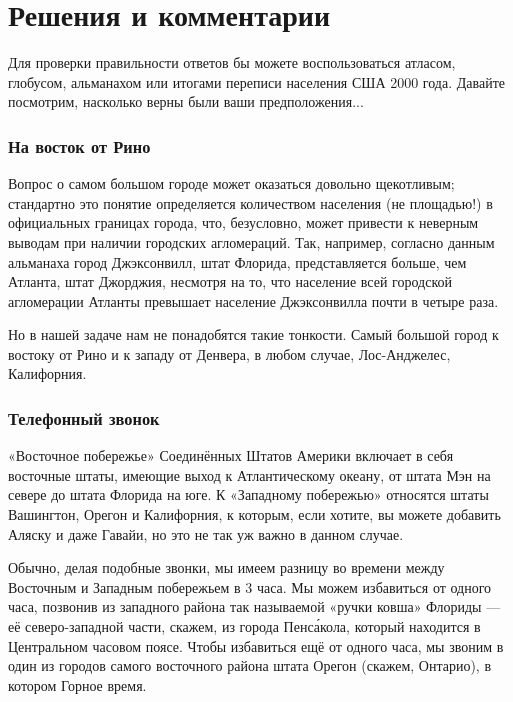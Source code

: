 \section*{Решения и комментарии}


Для проверки правильности ответов  бы можете воспользоваться атласом, глобусом, альманахом  или итогами переписи населения США 2000 года. 
Давайте посмотрим, насколько верны были ваши предположения...


\subsubsection*{На восток от Рино}%


Вопрос о самом большом городе может оказаться довольно щекотливым; 
стандартно  это понятие определяется количеством  населения (не площадью!) в официальных границах города, что, безусловно, может привести к неверным выводам
при наличии  городских агломераций.
Так, например, согласно данным альманаха город Джэксонвилл, штат Флорида, представляется больше, чем Атланта, штат Джорджия,  несмотря на то, что население всей городской агломерации Атланты превышает население Джэксонвилла почти в четыре раза.

\medskip

Но в нашей задаче нам не понадобятся такие тонкости. Самый большой город к востоку от Рино  и к западу от Денвера, в любом случае, Лос-Анджелес, Калифорния.                                                                                                                                  \heart






\subsubsection*{Телефонный звонок}%


«Восточное побережье»  Соединённых Штатов Америки включает в себя  восточные штаты, имеющие выход к Атлантическому океану,  от штата Мэн на севере до штата Флорида на юге. 
К «Западному  побережью»  относятся штаты Вашингтон, Орегон и Калифорния,
к  которым, если хотите, вы можете добавить Аляску и даже Гавайи,  но это не так уж важно в данном случае. %


Обычно, делая подобные звонки, мы имеем разницу во времени между Восточным и Западным побережьем в 3 часа.  Мы можем избавиться от одного часа, позвонив из  западного района так называемой  «ручки ковша» Флориды --- её северо-западной части, %
скажем, из города Пенс\'{а}кола, который находится в  Центральном часовом поясе.  
Чтобы избавиться ещё от одного часа, мы звоним в один из городов самого  восточного района  штата Орегон (скажем, Онтарио),  в котором Горное время. 

